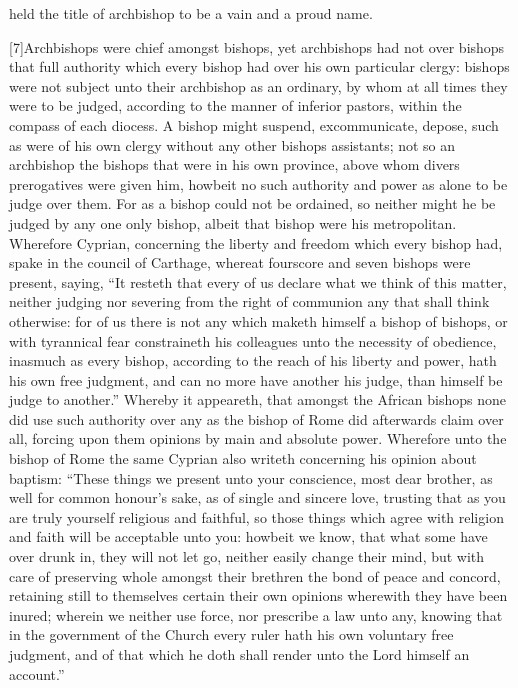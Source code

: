 held the title of archbishop to be a vain and a proud name.

[7]Archbishops were chief amongst bishops, yet archbishops had not over bishops that full authority which every bishop had over his own particular clergy: bishops were not  subject unto their archbishop as an ordinary, by whom at all times they were to be judged, according to the manner of inferior pastors, within the compass of each diocess. A bishop might suspend, excommunicate, depose, such as were of his own clergy without any other bishops assistants; not so an archbishop the bishops that were in his own province, above whom divers prerogatives were given him, howbeit no such authority and power as alone to be judge over them. For as a bishop could not be ordained, so neither might he be judged by any one only bishop, albeit that bishop were his metropolitan. Wherefore Cyprian, concerning the liberty and freedom which every bishop had, spake in the council of Carthage, whereat fourscore and seven bishops were present, saying, “It resteth that every of us declare what we think of this matter, neither judging nor severing from the right of communion any that shall think otherwise: for of us there is not any which maketh himself a bishop of bishops, or with tyrannical fear constraineth his colleagues unto the necessity of obedience, inasmuch as every bishop, according to the reach of his liberty and power, hath his own free judgment, and can no more have another his judge, than himself be judge to another.” Whereby it appeareth, that amongst the African bishops none did use such authority over any as the bishop of Rome did afterwards claim over all, forcing upon them opinions by main and absolute power. Wherefore unto the bishop of Rome the same Cyprian also writeth concerning his opinion about baptism: “These  things we present unto your conscience, most dear brother, as well for common honour’s sake, as of single and sincere love, trusting that as you are truly yourself religious and faithful, so those things which agree with religion and faith will be acceptable unto you: howbeit we know, that what some have over drunk in, they will not let go, neither easily change their mind, but with care of preserving whole amongst their brethren the bond of peace and concord, retaining still to themselves certain their own opinions wherewith they have been inured; wherein we neither use force, nor prescribe a law unto any, knowing that in the government of the Church every ruler hath his own voluntary free judgment, and of that which he doth shall render unto the Lord himself an account.”

